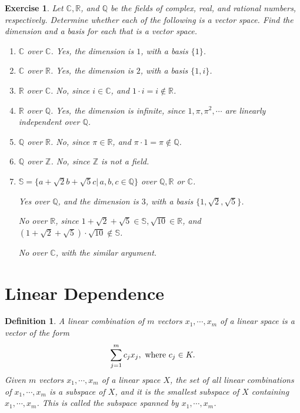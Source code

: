 \documentclass[11pt]{book}
\newtheorem{definition}{Definition}[chapter]
\newtheorem{exercise}{Exercise}[section]
\theoremstyle{definition}
\numberwithin{equation}{chapter}
\begin{document}
\medskip

\begin{exercise}\label{ex_6}{\rm \cite{1}}
Let $\mathbb{C},\mathbb{R}$, and $\mathbb{Q}$ be the fields of complex, real, and rational numbers, respectively. Determine whether each of the following is a vector space. Find the dimension and a basis for each that is a vector space.
\begin{enumerate}[label=(\alph*)]
    \item $\mathbb{C}$ over $\mathbb{C}$. Yes, the dimension is $1$, with a basis $\{1\}$.
    \item $\mathbb{C}$ over $\mathbb{R}$. Yes, the dimension is $2$, with a basis $\{1, i\}$.
    \item $\mathbb{R}$ over $\mathbb{C}$. No, since $i\in\mathbb{C}$, and $1\cdot i = i\notin\mathbb{R}$.
    \item $\mathbb{R}$ over $\mathbb{Q}$. Yes, the dimension is infinite, since $1,\pi,\pi^2,\cdots$ are linearly independent over $\mathbb{Q}$.
    \item $\mathbb{Q}$ over $\mathbb{R}$. No, since $\pi\in\mathbb{R}$, and $\pi\cdot 1 = \pi\notin\mathbb{Q}$.
    \item $\mathbb{Q}$ over $\mathbb{Z}$. No, since $\mathbb{Z}$ is not a field.
    \item $\mathbb{S} = \{a+\sqrt{2}b+\sqrt{5}c|\, a,b,c\in\mathbb{Q}\}$ over $\mathbb{Q},\mathbb{R}$ or $\mathbb{C}$. 
    
    Yes over $\mathbb{Q}$, and the dimension is $3$, with a basis $\{1,\sqrt{2},\sqrt{5}\}$. 
    
    No over $\mathbb{R}$, since $1+\sqrt{2}+\sqrt{5}\in\mathbb{S}, \sqrt{10}\in\mathbb{R}$, and $(1+\sqrt{2}+\sqrt{5})\cdot \sqrt{10}\notin\mathbb{S}$.
    
    No over $\mathbb{C}$, with the similar argument.
\end{enumerate}
\end{exercise}

\medskip

\section{Linear Dependence}

\begin{definition}
A linear combination of $m$ vectors $x_1,\cdots, x_m$ of a linear space is a vector of the form
\begin{align*}
    \sum^m_{j=1} c_j x_j, \,\,{\rm where}\,\, c_j \in K.
\end{align*}
Given $m$ vectors $x_1,\cdots, x_m$ of a linear space $X$, the set of all linear combinations of $x_1,\cdots, x_m$ is a subspace of $X$, and it is the smallest subspace of $X$
containing $x_1,\cdots, x_m$. This is called the subspace spanned by $x_1,\cdots, x_m$.
\end{definition}
\end{document}

